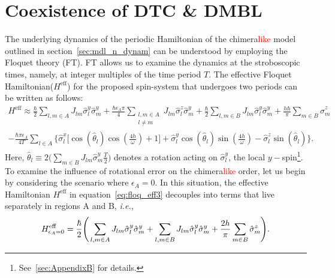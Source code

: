 \documentclass[12pt]{iopart}
\newcommand{\red}[1]{\textcolor{red}{#1}}
\begin{document}
\section{\label{sec:level3}Coexistence of DTC \& DMBL}	
The underlying dynamics of the periodic Hamiltonian of the chimera\red{like} model outlined in section~\ref{sec:mdl_n_dynam} can be understood by employing the Floquet theory (FT). FT allows us to examine the dynamics at the stroboscopic times, namely, at integer multiples of the time period $T$. The effective Floquet Hamiltonian($H^{\mathrm{eff}}$) for the proposed spin-system that undergoes two periods can be written as follows:
\begin{multline}
    H^{\mathrm{eff}} \approx\frac{\hbar}{2} \sum_{l,m\in A}J_{lm}\hat{\sigma}_l^y\hat{\sigma}_m^y +\frac{\hbar \epsilon_A \pi}{4} \sum_{\substack{l,m\in A\\l\neq m}} J_{lm}\hat{\sigma}^z_l\hat{\sigma}^y_m + \frac{\hbar}{2}\sum_{l,m\in B}J_{lm}\hat{\sigma}_l^y \hat{\sigma}_m^y + \frac{h\hbar}{\pi}\sum_{m \in B}\hat{\sigma}^z_m \\ -\frac{\hbar \pi \epsilon_A}{4T}\sum_{l\in A}\Bigg\{\hat{\sigma}^x_l \bigg[\cos(\hat{\theta}_l)\cos(\frac{4h}{\omega})+1 \bigg] + \hat{\sigma}^y_l \cos(\hat{\theta}_l)\sin(\frac{4h}{\omega})-\hat{\sigma}^z_l \sin(\hat{\theta}_l)\Bigg\}.
    \label{eq:floq_eff3}
\end{multline}
Here, $\displaystyle \hat{\theta}_l \equiv 2 \Big(\sum_{m \in B}J_{lm}\hat{\sigma}^y_m \frac{T}{2} \Big)$ denotes a rotation acting on $\hat{\sigma}^y_l$, the local $y-$spin\footnote{See~\ref{sec:AppendixB} for details.}. 
To examine the influence of rotational error on the chimera\red{like} order, let us begin by considering the scenario where $\epsilon_A=0$. In this situation, the effective Hamiltonian $H^\mathrm{eff}$ in equation~\eqref{eq:floq_eff3}  decouples into terms that live separately in regions A and B, \textit{i.e.},
\begin{equation}
    H^{\mathrm{eff}}_{\epsilon_A=0} =  \frac{\hbar}{2}\Bigg( \sum_{l,m\in A} J_{lm} \hat{\sigma}^y_l\hat{\sigma}^y_m +\sum_{l,m\in B} J_{lm} \hat{\sigma}^y_l\hat{\sigma}^y_m\\+\frac{2h }{\pi}\sum_{m \in B}\hat{\sigma}^z_m\Bigg).
\end{equation}
	
\end{document}
